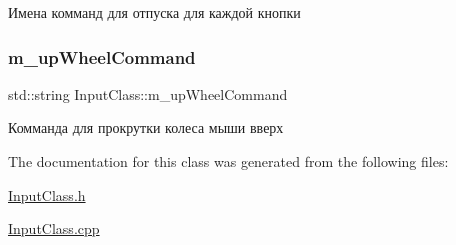Имена комманд для отпуска для каждой кнопки 

\mbox{\label{class_input_class_a636e5eea20ce8e5bf9851f9cbcd19cc4}} 
\subsubsection{\texorpdfstring{m\+\_\+up\+Wheel\+Command}{m\_upWheelCommand}}
{\footnotesize\ttfamily std\+::string Input\+Class\+::m\+\_\+up\+Wheel\+Command\hspace{0.3cm}{\ttfamily [private]}}



Комманда для прокрутки колеса мыши вверх 



The documentation for this class was generated from the following files\+:\begin{DoxyCompactItemize}
\item 
\hyperlink{_input_class_8h}{Input\+Class.\+h}\item 
\hyperlink{_input_class_8cpp}{Input\+Class.\+cpp}\end{DoxyCompactItemize}
